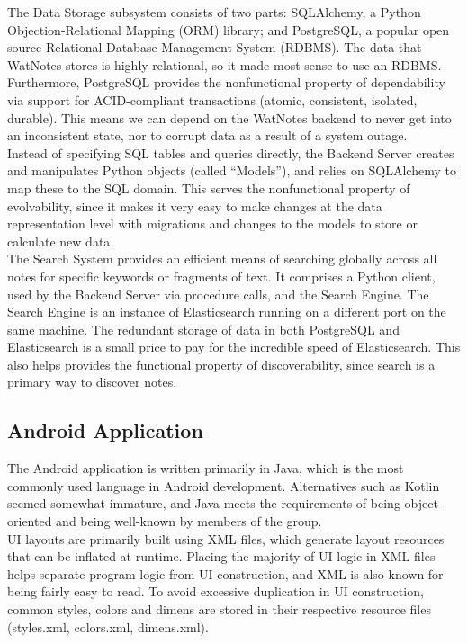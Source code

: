 \documentclass[12pt]{article}
\begin{document}
    The Data Storage subsystem consists of two parts: SQLAlchemy, a Python
    Objection-Relational Mapping (ORM) library; and PostgreSQL, a popular open
    source Relational Database Management System (RDBMS). The data that WatNotes
    stores is highly relational, so it made most sense to use an RDBMS.
    Furthermore, PostgreSQL provides the nonfunctional property of dependability
    via support for ACID-compliant transactions (atomic, consistent, isolated,
    durable). This means we can depend on the WatNotes backend to never get into
    an inconsistent state, nor to corrupt data as a result of a system outage.\\

    Instead of specifying SQL tables and queries directly, the Backend Server
    creates and manipulates Python objects (called ``Models''), and relies on
    SQLAlchemy to map these to the SQL domain. This serves the nonfunctional
    property of evolvability, since it makes it very easy to make changes at the
    data representation level with migrations and changes to the models to store
    or calculate new data.\\

    The Search System provides an efficient means of searching globally across
    all notes for specific keywords or fragments of text. It comprises a Python
    client, used by the Backend Server via procedure calls, and the Search
    Engine. The Search Engine is an instance of Elasticsearch running on a
    different port on the same machine. The redundant storage of data in both
    PostgreSQL and Elasticsearch is a small price to pay for the incredible
    speed of Elasticsearch. This also helps provides the functional property of
    discoverability, since search is a primary way to discover notes.

  \subsection{Android Application}
    The Android application is written primarily in Java, which is the most commonly used
    language in Android development. Alternatives such as Kotlin seemed somewhat immature, and
    Java meets the requirements of being object-oriented and being well-known by members of
    the group. \\

    UI layouts are primarily built using XML files, which generate layout resources
    that can be inflated at runtime. Placing the majority of UI logic in XML files helps
    separate program logic from UI construction, and XML is also known for being fairly easy to read.
    To avoid excessive duplication in UI construction, common styles, colors and dimens are
    stored in their respective resource files (styles.xml, colors.xml, dimens.xml). \\
\end{document}
